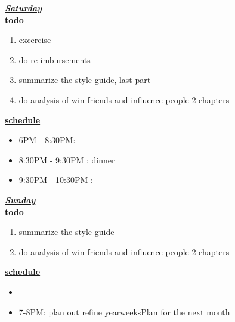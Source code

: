 \underline{\textbf{\textit{Saturday}}}\\
\underline{\textbf{todo}}\\
\begin{enumerate}
\item excercise
\item do re-imbursements
\item summarize the style guide, last part 
\item do analysis of win friends and influence people 2 chapters 
\end{enumerate}

\underline{\textbf{schedule}}\\
\begin{itemize}
\situationItem 12PM - 1PM:
\item 6PM - 8:30PM:
\item 8:30PM - 9:30PM : dinner
\item 9:30PM - 10:30PM :
\end{itemize}

\underline{\textbf{\textit{Sunday}}}\\
\underline{\textbf{todo}}\\
\begin{enumerate}
\item summarize the style guide 
\item do analysis of win friends and influence people 2 chapters 
\end{enumerate}

\underline{\textbf{schedule}}\\
\begin{itemize}
\item
\item 7-8PM: plan out refine yearweeksPlan for the next month
\end{itemize}

\newpage

